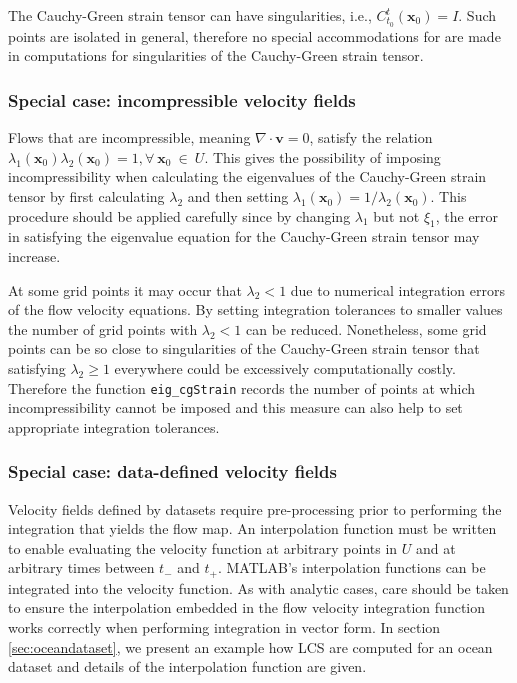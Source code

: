 \documentclass{article}
\begin{document}
The Cauchy-Green strain tensor can have singularities, i.e., $C_{t_0}^t(\boldsymbol x_0) = I$. Such points are isolated in general\parencite{delmarcelle94}, therefore no special accommodations for are made in computations for singularities of the Cauchy-Green strain tensor.

\subsubsection{Special case: incompressible velocity fields}

Flows that are incompressible, meaning $\nabla \cdot \boldsymbol v = 0$, satisfy the relation $\lambda_1(\boldsymbol x_0) \lambda_2(\boldsymbol x_0) = 1, \forall \: \boldsymbol x_0 \: \in \: U$\parencite{arnold78:_mathem}. This gives the possibility of imposing incompressibility when calculating the eigenvalues of the Cauchy-Green strain tensor by first calculating $\lambda_2$ and then setting $\lambda_1(\boldsymbol x_0) = 1/\lambda_2(\boldsymbol x_0)$. This procedure should be applied carefully since by changing $\lambda_1$ but not $\xi_1$, the error in satisfying the eigenvalue equation for the Cauchy-Green strain tensor may increase.

At some grid points it may occur that $\lambda_2 < 1$ due to numerical integration errors of the flow velocity equations. By setting integration tolerances to smaller values the number of grid points with $\lambda_2 < 1$ can be reduced. Nonetheless, some grid points can be so close to singularities of the Cauchy-Green strain tensor that satisfying $\lambda_2 \geq 1$ everywhere could be excessively computationally costly. Therefore the function \lstinline!eig_cgStrain! records the number of points at which incompressibility cannot be imposed and this measure can also help to set appropriate integration tolerances.

\subsubsection{Special case: data-defined velocity fields}

Velocity fields defined by datasets require pre-processing prior to performing the integration that yields the flow map. An interpolation function must be written to enable evaluating the velocity function at arbitrary points in $U$ and at arbitrary times between $t_-$ and $t_+$. MATLAB's interpolation functions can be integrated into the velocity function. As with analytic cases, care should be taken to ensure the interpolation embedded in the flow velocity integration function works correctly when performing integration in vector form. In section \ref{sec:oceandataset}, we present an example how LCS are computed for an ocean dataset and details of the interpolation function are given.
\end{document}
